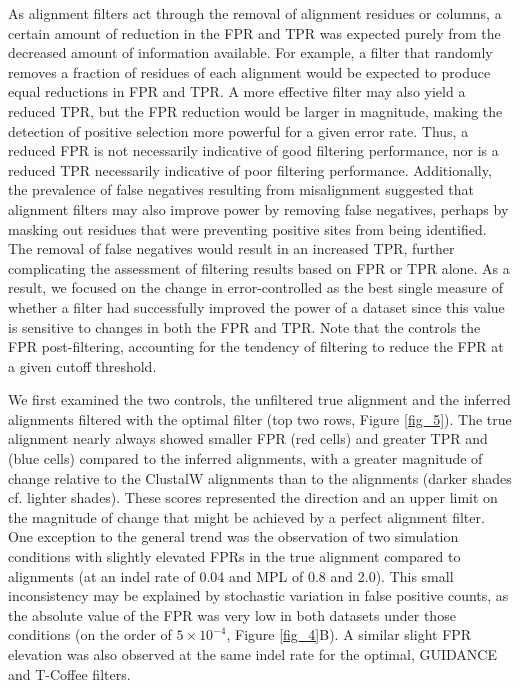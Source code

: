 \documentclass{article}
\begin{document}
As alignment filters act through the removal of alignment residues or
columns, a certain amount of reduction in the FPR and TPR was expected
purely from the decreased amount of information available. For
example, a filter that randomly removes a fraction of residues of each
alignment would be expected to produce equal reductions in FPR and
TPR. A more effective filter may also yield a reduced TPR, but the FPR
reduction would be larger in magnitude, making the detection of
positive selection more powerful for a given error rate. Thus, a
reduced FPR is not necessarily indicative of good filtering
performance, nor is a reduced TPR necessarily indicative of poor
filtering performance. Additionally, the prevalence of false negatives
resulting from misalignment suggested that alignment filters may also
improve power by removing false negatives, perhaps by masking out
residues that were preventing positive sites from being
identified. The removal of false negatives would result in an
increased TPR, further complicating the assessment of filtering
results based on FPR or TPR alone. As a result, we focused on the
change in error-controlled \tpr{} as the best single measure of
whether a filter had successfully improved the \sw power of a dataset
since this value is sensitive to changes in both the FPR and TPR. Note
that the \tpr controls the FPR post-filtering, accounting for the
tendency of filtering to reduce the FPR at a given cutoff threshold.

We first examined the two controls, the unfiltered true alignment and
the inferred alignments filtered with the optimal filter (top two
rows, Figure \ref{fig_5}). The true alignment nearly always showed
smaller FPR (red cells) and greater TPR and \tpr (blue cells) compared
to the inferred alignments, with a greater magnitude of change
relative to the ClustalW alignments than to the \prankc alignments
(darker shades cf. lighter shades). These scores represented the
direction and an upper limit on the magnitude of change that might be
achieved by a perfect alignment filter. One exception to the general
trend was the observation of two simulation conditions with slightly
elevated FPRs in the true alignment compared to \prankc alignments (at
an indel rate of 0.04 and MPL of 0.8 and 2.0). This small
inconsistency may be explained by stochastic variation in false
positive counts, as the absolute value of the FPR was very low in both
datasets under those conditions (on the order of $5\times10^{-4}$,
Figure \ref{fig_4}B). A similar slight FPR elevation was also observed
at the same indel rate for the optimal, GUIDANCE and T-Coffee filters.
\end{document}
